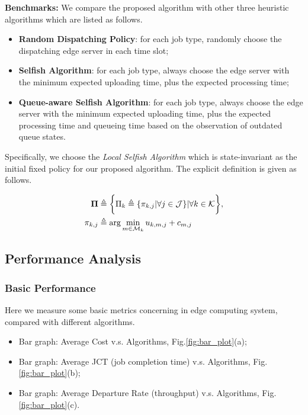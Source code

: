 \textbf{Benchmarks:}
We compare the proposed algorithm with other three heuristic algorithms which are listed as follows.
\begin{itemize}
    \item \textbf{Random Dispatching Policy}:
            for each job type, randomly choose the dispatching edge server in each time slot; 
    \item \textbf{Selfish Algorithm}:
            for each job type, always choose the edge server with the minimum expected uploading time, plus the expected processing time;
    \item \textbf{Queue-aware Selfish Algorithm}:
            for each job type, always choose the edge server with the minimum expected uploading time, plus the expected processing time and queueing time based on the observation of outdated queue states.
\end{itemize}
Specifically, we choose the \emph{Local Selfish Algorithm} which is state-invariant as the initial fixed policy for our proposed algorithm.
The explicit definition is given as follows.
\begin{policy}
    \begin{align}
        \boldsymbol{\Pi} &\triangleq \bigg\{ \Pi_{k}\triangleq\{\pi_{k,j}|\forall j\in\mathcal{J}\} |\forall k\in\mathcal{K} \bigg\},
        \\
        \pi_{k,j} &\triangleq \arg\min_{m\in\mathcal{M}_{k}} u_{k,m,j} + c_{m,j}
    \end{align} 
\end{policy}

\subsection{Performance Analysis}
    \subsubsection{Basic Performance}
    Here we measure some basic metrics concerning in edge computing system, compared with different algorithms.
    \begin{itemize}
        \item Bar graph: Average Cost v.s. Algorithms, Fig.\ref{fig:bar_plot}(a);
        \item Bar graph: Average JCT (job completion time) v.s. Algorithms, Fig.\ref{fig:bar_plot}(b); %
        \item Bar graph: Average Departure Rate (throughput) v.s. Algorithms, Fig.\ref{fig:bar_plot}(c). 
    \end{itemize}

